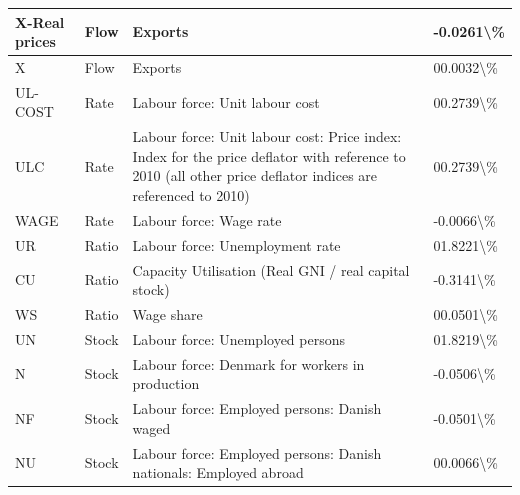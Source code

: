 \documentclass[
]{book}
\begin{document}
\begin{table}
\begin{tabular}[t]{l|l|l|l}
\hline
X-Real prices & Flow & Exports & -0.0261\textbackslash{}\%\\
\hline
X & Flow & Exports & 00.0032\textbackslash{}\%\\
\hline
UL-COST & Rate & Labour force: Unit labour cost & 00.2739\textbackslash{}\%\\
\hline
ULC & Rate & Labour force: Unit labour cost: Price index: Index for the price deflator with reference to 2010 (all other price deflator indices are referenced to 2010) & 00.2739\textbackslash{}\%\\
\hline
WAGE & Rate & Labour force: Wage rate & -0.0066\textbackslash{}\%\\
\hline
UR & Ratio & Labour force: Unemployment rate & 01.8221\textbackslash{}\%\\
\hline
CU & Ratio & Capacity Utilisation (Real GNI  /  real capital stock) & -0.3141\textbackslash{}\%\\
\hline
WS & Ratio & Wage share & 00.0501\textbackslash{}\%\\
\hline
UN & Stock & Labour force: Unemployed persons & 01.8219\textbackslash{}\%\\
\hline
N & Stock & Labour force: Denmark for workers in production & -0.0506\textbackslash{}\%\\
\hline
NF & Stock & Labour force: Employed persons: Danish waged & -0.0501\textbackslash{}\%\\
\hline
NU & Stock & Labour force: Employed persons: Danish nationals: Employed abroad & 00.0066\textbackslash{}\%\\
\hline
\end{tabular}
\end{table}
\end{document}

